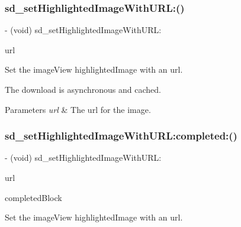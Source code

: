 \subsubsection{\texorpdfstring{sd\+\_\+set\+Highlighted\+Image\+With\+U\+R\+L\+:()}{sd\_setHighlightedImageWithURL:()}\hspace{0.1cm}{\footnotesize\ttfamily [3/3]}}
{\footnotesize\ttfamily -\/ (void) sd\+\_\+set\+Highlighted\+Image\+With\+U\+R\+L\+: \begin{DoxyParamCaption}\item[{(N\+S\+U\+RL $\ast$)}]{url }\end{DoxyParamCaption}}

Set the image\+View {\ttfamily highlighted\+Image} with an {\ttfamily url}.

The download is asynchronous and cached.


\begin{DoxyParams}{Parameters}
{\em url} & The url for the image. \\
\hline
\end{DoxyParams}
\mbox{\label{category_u_i_image_view_07_highlighted_web_cache_08_a25316746c184695632dd8f4b36fd219c}} 
\subsubsection{\texorpdfstring{sd\+\_\+set\+Highlighted\+Image\+With\+U\+R\+L\+:completed\+:()}{sd\_setHighlightedImageWithURL:completed:()}\hspace{0.1cm}{\footnotesize\ttfamily [1/3]}}
{\footnotesize\ttfamily -\/ (void) sd\+\_\+set\+Highlighted\+Image\+With\+U\+R\+L\+: \begin{DoxyParamCaption}\item[{(N\+S\+U\+RL $\ast$)}]{url }\item[{completed:(S\+D\+Web\+Image\+Completion\+Block)}]{completed\+Block }\end{DoxyParamCaption}}

Set the image\+View {\ttfamily highlighted\+Image} with an {\ttfamily url}.

